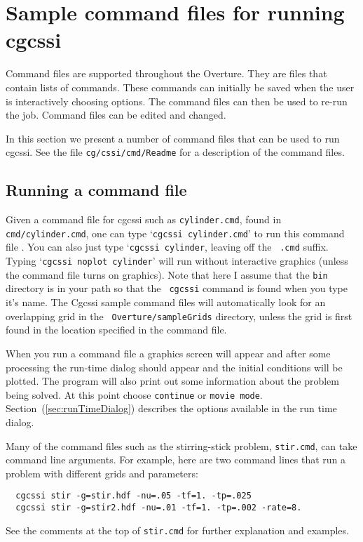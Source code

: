 \documentclass{article}
\newcommand{\Index}[1]{#1\index{#1}}
\begin{document}
\clearpage
\section{Sample command files for running cgcssi} \label{sec:demo}

Command files are supported throughout the Overture. They are files
that contain lists of commands. These commands can initially be saved
when the user is interactively choosing options.  The \Index{command files}
can then be used to re-run the job. Command files can be edited and
changed.

In this section we present a number of command files that can be used
to run cgcssi. See the file {\tt cg/cssi/cmd/Readme} for a description of
the command files. 

\subsection{Running a command file}

Given a \Index{command file} for cgcssi such as {\tt cylinder.cmd}, found in {\tt
cmd/cylinder.cmd}, one can type `{\tt cgcssi cylinder.cmd}' to run this command
file . You can also just type `{\tt cgcssi cylinder}, leaving off the {\tt
.cmd} suffix. Typing `{\tt cgcssi noplot cylinder}' will run without
interactive graphics (unless the command file turns on graphics). Note that here
I assume that the {\tt bin} directory is in your path so that the {\tt
cgcssi} command is found when you type it's name. The Cgcssi sample
command files will automatically look for an overlapping grid in the {\tt
Overture/sampleGrids} directory, unless the grid is first found in the location
specified in the command file.

When you run a command file a graphics screen will appear and after some
processing the run-time dialog should appear and the initial conditions will be
plotted. The program will also print out some information about the problem
being solved. At this point choose {\tt continue} or {\tt movie
mode}. Section~(\ref{sec:runTimeDialog}) describes the options available in the
run time dialog.

Many of the command files such as the stirring-stick problem, {\tt stir.cmd},
can take command line arguments.  For example, here
are two command lines that run a problem with different grids and parameters:
\begin{verbatim}
  cgcssi stir -g=stir.hdf -nu=.05 -tf=1. -tp=.025 
  cgcssi stir -g=stir2.hdf -nu=.01 -tf=1. -tp=.002 -rate=8.
\end{verbatim}
See the comments at the top of {\tt stir.cmd} for further explanation and examples.
\end{document}
